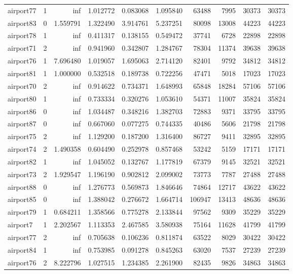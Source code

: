 \begin{longtable}{|l|r|r|r|r|r|r|r|r|r|}
airport77 & 1 & inf & 1.012772 & 0.083068 & 1.095840 & 63488 & 7995 & 30373 & 30373 \\
airport83 & 0 & 1.559791 & 1.322490 & 3.914761 & 5.237251 & 80098 & 13008 & 44223 & 44223 \\
airport78 & 1 & inf & 0.411317 & 0.138155 & 0.549472 & 37741 & 6728 & 22898 & 22898 \\
airport71 & 2 & inf & 0.941960 & 0.342807 & 1.284767 & 78304 & 11374 & 39638 & 39638 \\
airport76 & 1 & 7.696480 & 1.019057 & 1.695063 & 2.714120 & 82401 & 9792 & 34812 & 34812 \\
airport81 & 1 & 1.000000 & 0.532518 & 0.189738 & 0.722256 & 47471 & 5018 & 17023 & 17023 \\
airport70 & 2 & inf & 0.914622 & 0.734371 & 1.648993 & 65848 & 18284 & 57106 & 57106 \\
airport80 & 1 & inf & 0.733334 & 0.320276 & 1.053610 & 54371 & 11007 & 35824 & 35824 \\
airport86 & 0 & inf & 1.034487 & 0.348216 & 1.382703 & 72883 & 9371 & 33795 & 33795 \\
airport87 & 0 & inf & 0.667060 & 0.077275 & 0.744335 & 40486 & 5606 & 21798 & 21798 \\
airport75 & 2 & inf & 1.129200 & 0.187200 & 1.316400 & 86727 & 9411 & 32895 & 32895 \\
airport74 & 2 & 1.490358 & 0.604490 & 0.252978 & 0.857468 & 53242 & 5159 & 17171 & 17171 \\
airport82 & 1 & inf & 1.045052 & 0.132767 & 1.177819 & 67379 & 9145 & 32521 & 32521 \\
airport73 & 2 & 1.929547 & 1.196190 & 0.902812 & 2.099002 & 73773 & 7787 & 27488 & 27488 \\
airport88 & 0 & inf & 1.276773 & 0.569873 & 1.846646 & 74864 & 12717 & 43622 & 43622 \\
airport85 & 0 & inf & 1.388042 & 0.276672 & 1.664714 & 106947 & 13413 & 48636 & 48636 \\
airport79 & 1 & 0.684211 & 1.358566 & 0.775278 & 2.133844 & 97562 & 9309 & 35229 & 35229 \\
airport7 & 1 & 2.202567 & 1.113353 & 2.467585 & 3.580938 & 75164 & 11628 & 41799 & 41799 \\
airport77 & 2 & inf & 0.705638 & 0.106236 & 0.811874 & 63522 & 8029 & 30422 & 30422 \\
airport84 & 1 & inf & 0.753985 & 0.091278 & 0.845263 & 63020 & 7537 & 27239 & 27239 \\
airport76 & 2 & 8.222796 & 1.027515 & 1.234385 & 2.261900 & 82435 & 9826 & 34863 & 34863 \\

\end{longtable}

